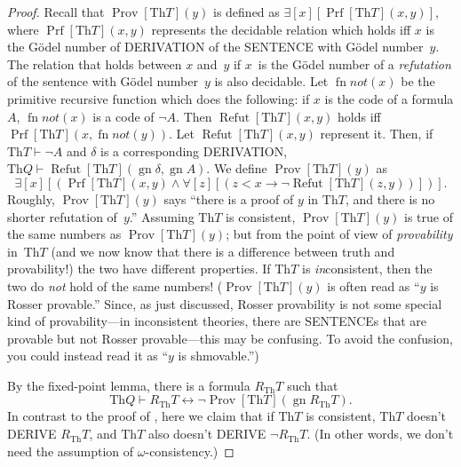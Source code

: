 \documentclass[10pt,a4paper]{article}
\makeatletter
\newcommand*{\olup}[1]{\MakeUppercase{#1}}
\theoremstyle{plain}
\theoremstyle{definition}
\theoremstyle{remark}
\newcommand*{\ollabel}[1]{\label{#1}}
\newcommand{\olref}{\@ifnextchar[{\olref@i}{\olref@final}}
\def\olref@i[#1]{\@ifnextchar[{\olref@ii}{\olref@final}}
\def\olref@ii[#1]{\@ifnextchar[{\olref@iii}{\olref@final}}
\def\olref@iii[#1]{\olref@final}
\def\olref@final#1{\ref{#1}}
\providecommand{\lif}{\mathbin{\rightarrow}}
\providecommand{\lforall}{\mathord{\forall}}
\providecommand{\lexists}{\mathord{\exists}}
\providecommand{\Proves}{\mathrel{\vdash}}
\providecommand{\Th}{\ensuremath{\mathrm{Th}}}
\providecommand{\Prf}{\operatorname{Prf}}
\providecommand{\gn}{\operatorname{gn}}
\providecommand{\liff}{\mathbin{\leftrightarrow}}
\providecommand{\OProv}{\operatorname{Prov}}
\providecommand{\OPrf}{\operatorname{Prf}}
\providecommand{\ORefut}{\operatorname{Refut}}
\providecommand{\ORProv}{\operatorname{Prov}}
\providecommand{\Refut}{\operatorname{Refut}}
\providecommand{\fn}{\operatorname{fn}}
\makeatother
\begin{document}
\begin{proof}
Recall that $\OProv[\Th{T}](y)$ is defined as $\lexists[x][\OPrf[\Th{T}](x,
  y)]$, where $\OPrf[\Th{T}](x, y)$ represents the decidable relation which
holds iff $x$ is the G\"odel number of \olup{derivation} of the
\olup{sentence} with G\"odel number~$y$. The relation that holds between
$x$ and~$y$ if $x$~is the G\"odel number of a \emph{refutation} of the
sentence with G\"odel number~$y$ is also decidable. Let $\fn{not}(x)$
be the primitive recursive function which does the following: if $x$
is the code of a formula $A$, $\fn{not}(x)$ is a code of $\lnot
A$. Then $\Refut[\Th{T}](x, y)$ holds iff $\Prf[\Th{T}](x, \fn{not}(y))$.  Let
$\ORefut[\Th{T}](x, y)$ represent it.  Then, if $\Th{T} \Proves \lnot A$
and $\delta$ is a corresponding \olup{derivation}, $\Th{Q} \Proves
\ORefut[\Th{T}](\gn{\delta}, \gn{A})$.  We define $\ORProv[\Th{T}](y)$ as
\[
\lexists[x][(\OPrf[\Th{T}](x,y) \land \lforall[z][(z < x \lif \lnot
  \ORefut[\Th{T}](z,y))])].
\]
Roughly, $\ORProv[\Th{T}](y)$ says ``there is a proof of $y$ in $\Th{T}$,
and there is no shorter refutation of~$y$.''  Assuming $\Th{T}$ is
consistent, $\ORProv[\Th{T}](y)$ is true of the same numbers as
$\OProv[\Th{T}](y)$; but from the point of view of \emph{provability}
in~$\Th{T}$ (and we now know that there is a difference between truth
and provability!) the two have different properties. If $\Th{T}$ is
\emph{in}consistent, then the two do \emph{not} hold of the same
numbers!{} ($\ORProv[\Th{T}](y)$ is often read as ``$y$ is Rosser
provable.'' Since, as just discussed, Rosser provability is not some
special kind of provability---in inconsistent theories, there are
\olup{sentence}s that are provable but not Rosser provable---this may be
confusing. To avoid the confusion, you could instead read it as
``$y$ is shmovable.'')

By the fixed-point lemma, there is a formula $R_\Th{T}$ such that
\begin{equation}
  \Th{Q} \Proves R_\Th{T} \liff \lnot \ORProv[\Th{T}](\gn{R_\Th{T}}).
  \ollabel{RT}
\end{equation}
In contrast to the proof of \olref[1in]{thm:first-incompleteness},
here we claim that if $\Th{T}$ is consistent, $\Th{T}$ doesn't \olup{derive}
$R_\Th{T}$, and $\Th{T}$ also doesn't \olup{derive} $\lnot R_\Th{T}$. (In
other words, we don't need the assumption of $\omega$-consistency.)


\end{proof}
\end{document}
